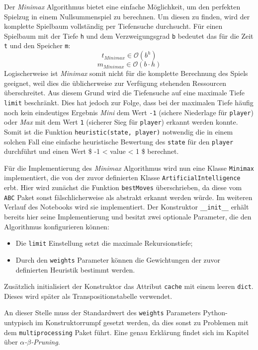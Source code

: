 \documentclass[11pt]{article}
\providecommand{\tightlist}{%
      \setlength{\itemsep}{0pt}\setlength{\parskip}{0pt}}
\begin{document}
Der \emph{Minimax} Algorithmus bietet eine einfache Möglichkeit, um den
perfekten Spielzug in einem Nullsummenspiel zu berechnen. Um diesen zu
finden, wird der komplette Spielbaum vollständig per Tiefensuche
durchsucht. Für einen Spielbaum mit der Tiefe \texttt{h} und dem
Verzweigungsgrad \texttt{b} bedeutet das für die Zeit \texttt{t} und den
Speicher \texttt{m}: \[ t_{Minimax} \in \mathcal{O}(b^h) \]
\[ m_{Minimax} \in \mathcal{O}(b\cdot h) \] Logischerweise ist
\emph{Minimax} somit nicht für die komplette Berechnung des Spiels
geeignet, weil dies die üblicherweise zur Verfügung stehenden Ressourcen
überschreitet. Aus diesem Grund wird die Tiefensuche auf eine maximale
Tiefe \texttt{limit} beschränkt. Dies hat jedoch zur Folge, dass bei der
maximalen Tiefe häufig noch kein eindeutiges Ergebnis \emph{Mini} dem
Wert \texttt{-1} (sichere Niederlage für \texttt{player}) oder
\emph{Max} mit dem Wert \texttt{1} (sicherer Sieg für \texttt{player})
erkannt werden konnte. Somit ist die Funktion
\texttt{heuristic(state,\ player)} notwendig die in einem solchen Fall
eine einfache heuristische Bewertung des \texttt{state} für den
\texttt{player} durchführt und einen Wert \$ -1 \textless{} value
\textless{} 1 \$ berechnet.

    Für die Implementierung des \emph{Minimax} Algorithmus wird nun eine
Klasse \texttt{Minimax} implementiert, die von der zuvor definierten
Klasse \texttt{ArtificialIntelligence} erbt. Hier wird zunächst die
Funktion \texttt{bestMoves} überschrieben, da diese vom \texttt{ABC}
Paket sonst fälschlicherweise als abstrakt erkannt werden würde. Im
weiteren Verlauf des Notebooks wird sie implementiert. Der Konstruktor
\texttt{\_\_init\_\_} erhält bereits hier seine Implementierung und
besitzt zwei optionale Parameter, die den Algorithmus konfigurieren
können:

\begin{itemize}
\tightlist
\item
  Die \texttt{limit} Einstellung setzt die maximale Rekursionstiefe;
\item
  Durch den \texttt{weights} Parameter können die Gewichtungen der zuvor
  definierten Heuristik bestimmt werden.
\end{itemize}

Zusätzlich initialisiert der Konstruktor das Attribut \texttt{cache} mit
einem leeren \texttt{dict}. Dieses wird später als Transpositionstabelle
verwendet.

An dieser Stelle muss der Standardwert des \texttt{weights} Parameters
Python-untypisch im Konstruktorrumpf gesetzt werden, da dies sonst zu
Problemen mit dem \texttt{multiprocessing} Paket führt. Eine genau
Erklärung findet sich im Kapitel über \emph{$\alpha$-$\beta$-Pruning}.
\end{document}

